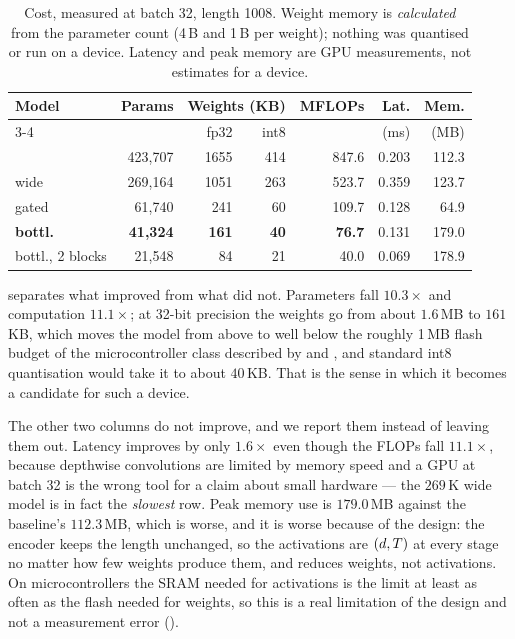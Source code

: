 \begin{table}[t]
\caption{Cost, measured at batch 32, length 1008. Weight memory is \emph{calculated} from the
parameter count (4\,B and 1\,B per weight); nothing was quantised or run on a device. Latency and
peak memory are GPU measurements, not estimates for a device.}
\label{tab:cost}
\begin{center}
\small
\setlength{\tabcolsep}{5pt}
\begin{tabular}{lrrrrrr}
\toprule
\textbf{Model} & Params & \multicolumn{2}{c}{Weights (KB)} & MFLOPs & Lat. & Mem. \\
\cmidrule(lr){3-4}
 & & fp32 & int8 & & (ms) & (MB) \\
\midrule
\millet{}               & 423{,}707 & 1655 & 414 & 847.6 & 0.203 & 112.3 \\
\seanet{} wide          & 269{,}164 & 1051 & 263 & 523.7 & 0.359 & 123.7 \\
\seanet{} gated         &  61{,}740 &  241 &  60 & 109.7 & 0.128 &  64.9 \\
\textbf{\seanet{} bottl.} & \textbf{41{,}324} & \textbf{161} & \textbf{40} & \textbf{76.7} & 0.131 & 179.0 \\
\seanet{} bottl., 2 blocks & 21{,}548 &   84 &  21 &  40.0 & 0.069 & 178.9 \\
\bottomrule
\end{tabular}
\end{center}
\end{table}

 separates what improved from what did not. Parameters fall $10.3\times$ and
computation $11.1\times$; at 32-bit precision the weights go from about $1.6$\,MB to $161$\,KB, which
moves the model from above to well below the roughly 1\,MB flash budget of the microcontroller class
described by \citet{lin2020mcunet} and \citet{banbury2021micronets}, and standard int8 quantisation
\citep{jacob2018quantization} would take it to about $40$\,KB. That is the sense in which it becomes
a candidate for such a device.

The other two columns do not improve, and we report them instead of leaving them out. Latency
improves by only $1.6\times$ even though the FLOPs fall $11.1\times$, because depthwise convolutions
are limited by memory speed and a GPU at batch 32 is the wrong tool for a claim about small hardware
--- the $269$\,K wide model is in fact the \emph{slowest} row. Peak memory use is $179.0$\,MB against
the baseline's $112.3$\,MB, which is worse, and it is worse because of the design: the encoder keeps
the length unchanged, so the activations are $(d, T)$ at every stage no matter how few
weights produce them, and  reduces weights, not activations. On microcontrollers
the SRAM needed for activations is the limit at least as often as the flash needed for weights, so
this is a real limitation of the design and not a measurement error ().

